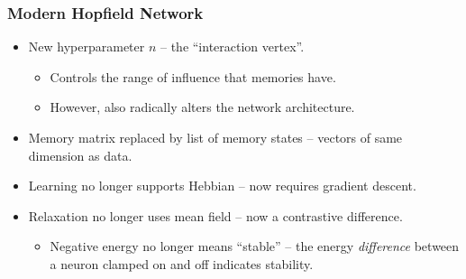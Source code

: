 \begin{frame}
	
    \frametitle{Modern Hopfield Network}
    \begin{itemize}
        \item New hyperparameter \(n\) -- the ``interaction vertex''.
        \begin{itemize}
            \item Controls the range of influence that memories have.
            \item However, also radically alters the network architecture.
        \end{itemize}

        \pause
        \item Memory matrix replaced by list of memory states -- vectors of same dimension as data.
        \pause
        \item Learning no longer supports Hebbian -- now requires gradient descent.
        \pause
        \item Relaxation no longer uses mean field -- now a contrastive difference.
        \begin{itemize}
            \item Negative energy no longer means ``stable'' -- the energy \textit{difference} between a neuron clamped on and off indicates stability.
        \end{itemize}
        
    \end{itemize}
\end{frame}